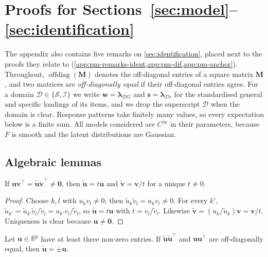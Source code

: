 \section{Proofs for Sections~\ref{sec:model}--\ref{sec:identification}}\label{app:proofs-measurement}

The appendix also contains five remarks on \cref{sec:identification}, placed next to the proofs they relate to (\cref{app:pm-remarks-ident,app:pm-dif,app:pm-anchor}). Throughout, $\operatorname{offdiag}(\bm M)$ denotes the off-diagonal entries of a square matrix $\bm M$, and two matrices are \emph{off-diagonally equal} if their off-diagonal entries agree. For a domain $\mathcal D\in\{\mathcal S,\mathcal I\}$ we write $\bm w=\bm\lambda_{\mathcal DG}$ and $\bm s=\bm\lambda_{\mathcal Ds}$ for the standardised general and specific loadings of its items, and we drop the superscript $\mathcal D$ when the domain is clear. Response patterns take finitely many values, so every expectation below is a finite sum. All models considered are $C^\infty$ in their parameters, because $F$ is smooth and the latent distributions are Gaussian.

\subsection{Algebraic lemmas}\label{app:pm-lemmas}

\begin{lemma}\label{lem:app-rank1}
If $\bm u\bm v^\top=\tilde{\bm u}\tilde{\bm v}^\top\neq\bm0$, then $\tilde{\bm u}=t\bm u$ and $\tilde{\bm v}=\bm v/t$ for a unique $t\neq0$.
\end{lemma}

\begin{proof}
Choose $k,l$ with $u_kv_l\neq0$; then $\tilde u_k\tilde v_l=u_kv_l\neq0$. For every $k'$, $\tilde u_{k'}=\tilde u_{k'}\tilde v_l/\tilde v_l=u_{k'}v_l/\tilde v_l$, so $\tilde{\bm u}=t\bm u$ with $t=v_l/\tilde v_l$. Likewise $\tilde{\bm v}=(u_k/\tilde u_k)\bm v=\bm v/t$. Uniqueness is clear because $\bm u\neq\bm0$.
\end{proof}

\begin{lemma}\label{lem:app-onefactor}
Let $\bm u\in\mathbb R^p$ have at least three non-zero entries. If $\tilde{\bm u}\tilde{\bm u}^\top$ and $\bm u\bm u^\top$ are off-diagonally equal, then $\tilde{\bm u}=\pm\bm u$.
\end{lemma}

